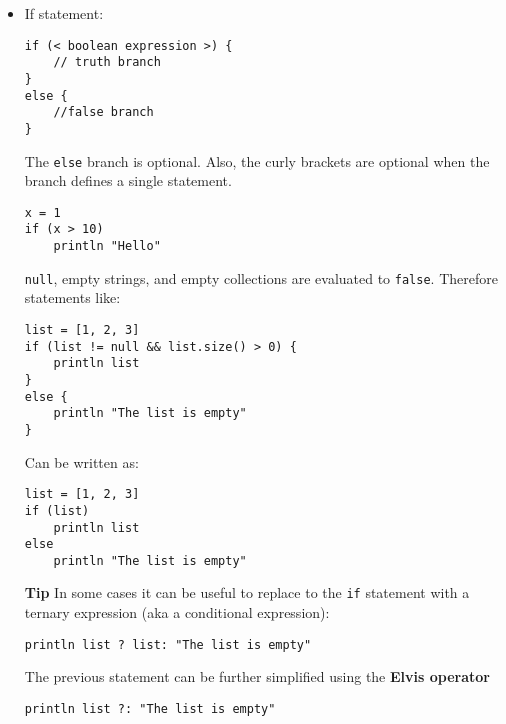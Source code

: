 \documentclass[letterpaper,11pt]{article}
\begin{document}
\begin{itemize}
\begin{verbatim}
x = "Hello"
y = "World"
println "$x $y"
    \end{verbatim}
String literals can also be defined using the / character as a delimeter. They are known as \textbf{slashy} string and are useful for defining regular expressions and patterns, as there is no need to escape backslashes. As with double-quote strings they allow to interpolate variables prefixed with a \$ character.
    \begin{verbatim}
x = /tic\tac\toe/
y = 'tic\tac\toe'
z = "tic\tac\toe"
    \end{verbatim}
Multiline strings can be defined by delimiting it with triple or single or double quotes
\begin{verbatim}
text = """
    Hello there!
    How are you today?
    """
\end{verbatim}
The same can also acheived by using / as delimeter:
\begin{verbatim}
text = /
    Hello there!
    Isn't is amazing?
    /
\end{verbatim}

\item If statement:
\begin{verbatim}
if (< boolean expression >) {
    // truth branch
}
else {
    //false branch
}
\end{verbatim}
The \texttt{else} branch is optional. Also, the curly brackets are optional when the branch defines a single statement.
\begin{verbatim}
x = 1
if (x > 10)
    println "Hello"
\end{verbatim}
\texttt{null}, empty strings, and empty collections are evaluated to \texttt{false}. Therefore statements like:
\begin{verbatim}
list = [1, 2, 3]
if (list != null && list.size() > 0) {
    println list
}
else {
    println "The list is empty"
}
\end{verbatim}
Can be written as:
\begin{verbatim}
list = [1, 2, 3]
if (list)
    println list
else
    println "The list is empty"
\end{verbatim}
\textbf{Tip} In some cases it can be useful to replace to the \texttt{if} statement with a ternary expression (aka a conditional expression):
\begin{verbatim}
println list ? list: "The list is empty"
\end{verbatim}
The previous statement can be further simplified using the \textbf{Elvis operator}
\begin{verbatim}
println list ?: "The list is empty"    
\end{verbatim}


\end{itemize}
\end{document}
